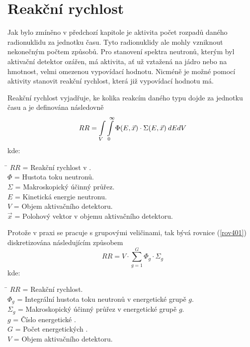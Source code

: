 \section{Reakční rychlost}
Jak bylo zmíněno v předchozí kapitole je aktivita počet rozpadů daného radionuklidu za jednotku času. Tyto radionuklidy ale mohly vzniknout nekonečným počtem způsobů. Pro stanovení spektra neutronů, kterým byl aktivační detektor ozářen, má \gls{aktivita}, ať už vztažená na jádro nebo na hmotnost, velmi omezenou vypovídací hodnotu. Nicméně je možné pomocí aktivity stanovit reakční rychlost, která již vypovídací hodnotu má.

Reakční rychlost vyjadřuje, ke kolika reakcím daného typu dojde za jednotku času a je definována následovně
\begin{equation}
    \label{rov401}
    RR = \int\displaylimits_{V}\int\displaylimits_{0}^{\infty} \Phi(E,\vec{x}) \cdot \Sigma(E,\vec{x}) \: dE dV
\end{equation}
kde:
\begin{tabbing}
    \= \kill
    $RR$\> = Reakční rychlost v . \\
    $\Phi$\> = Hustota toku neutronů. \\
    $\Sigma$\> = Makroskopický účinný průřez. \\
    $E$\> = Kinetická energie neutronu. \\
    $V$\> = Objem aktivačního detektoru. \\
    $\vec{x}$\> = Polohový vektor v objemu aktivačního detektoru. \\
\end{tabbing}

Protože v praxi se pracuje s grupovými veličinami, tak bývá rovnice (\ref{rov401}) diskretizována následujícím způsobem
\begin{equation}
    \label{rov402}
    RR = V \cdot \sum_{g=1}^{G} \Phi_g \cdot \Sigma_g
\end{equation}
kde:
\begin{tabbing}
    \= \kill
    $RR$\> = Reakční rychlost. \\
    $\Phi_g$\> = Integrální hustota toku neutronů v energetické grupě $g$. \\
    $\Sigma_g$\> = Makroskopický účinný průřez v energetické grupě $g$. \\
    $g$\> = Číslo energetické . \\
    $G$\> = Počet energetických . \\
    $V$\> = Objem aktivačního detektoru. \\
\end{tabbing}

